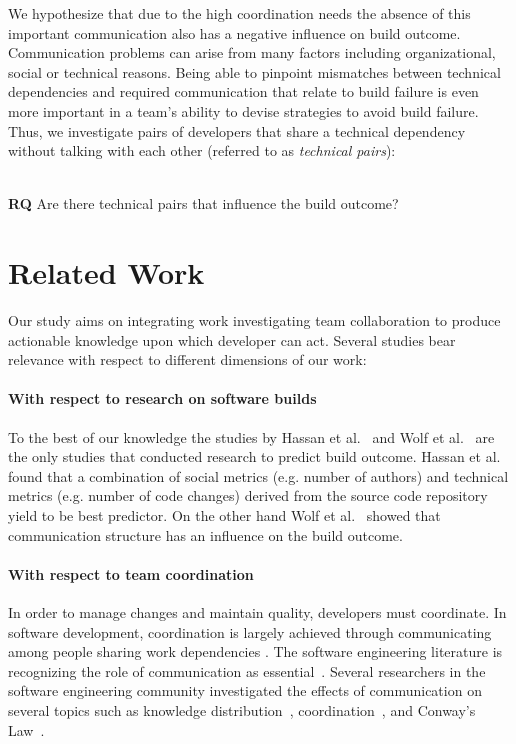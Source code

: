 \documentclass[conference]{IEEEtran}
\begin{document}
We hypothesize that due to the high coordination needs the absence of this
important communication also has a negative influence on build outcome. Communication problems can arise from many factors including organizational,
social or technical reasons. Being able to pinpoint
mismatches between technical dependencies and required communication that
relate to build failure is even more important in a team's
ability to devise strategies to avoid build failure. Thus, we
investigate pairs of developers that share a technical dependency without talking
with each other (referred to as \emph{technical pairs}):
\ \\ \


\textbf{RQ} Are there technical pairs that influence the build outcome?
 

 \section{Related Work}
\label{sec:relwork}
Our study aims on integrating work investigating team collaboration to produce actionable knowledge upon which developer can act.
Several studies bear relevance with respect to different dimensions of our work:

\paragraph{With respect to research on software builds}
To the best of our knowledge the studies by Hassan et al.~\cite{hassan:ase:2006}
and Wolf et al.~\cite{wolf:icse:2009} are the only studies that conducted
research to predict build outcome. Hassan et al.~\cite{hassan:ase:2006} found
that a combination of social metrics (e.g. number of authors) and technical
metrics (e.g. number of code changes) derived from the source code repository
yield to be best predictor. 
On the other hand Wolf et al.~\cite{wolf:icse:2009} showed that communication structure has an influence on the build outcome.

\paragraph{With respect to team coordination}
In order to manage changes and maintain quality, developers must coordinate. In
software development, coordination is largely achieved through communicating among
people sharing work dependencies \cite{kraut1995:coordination}. The
software engineering literature is recognizing the role of communication as essential~\cite{nakakoji2010:rdc}.
Several researchers in the software engineering community investigated the effects of communication on several topics such as knowledge distribution~\cite{ehrlich:icgse:2006}, coordination~\cite{hinds:cscw:2006}, and Conway's Law~\cite{cataldo:cscw:2006}.
\end{document}
